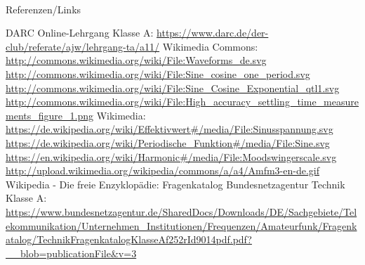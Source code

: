 \renewcommand{\refname}{Referenzen}

\hypertarget{refs}{}
\textcolor{white}{} \\ %
\Large Referenzen/Links
\footnotesize

\begin{thebibliography}{}
      DARC Online-Lehrgang Klasse A:
                    \url{https://www.darc.de/der-club/referate/ajw/lehrgang-ta/a11/}
        Wikimedia Commons: \\
                    \url{http://commons.wikimedia.org/wiki/File:Waveforms_de.svg}\\
                    \url{http://commons.wikimedia.org/wiki/File:Sine_cosine_one_period.svg}\\
                    \url{http://commons.wikimedia.org/wiki/File:Sine_Cosine_Exponential_qtl1.svg}\\
                    \url{http://commons.wikimedia.org/wiki/File:High_accuracy_settling_time_measurements_figure_1.png}
  	  Wikimedia:\\
  	  \url{https://de.wikipedia.org/wiki/Effektivwert#/media/File:Sinusspannung.svg}\\
  	  \url{https://de.wikipedia.org/wiki/Periodische_Funktion#/media/File:Sine.svg}\\
  	  \url{https://en.wikipedia.org/wiki/Harmonic#/media/File:Moodswingerscale.svg}\\
  	  \url{http://upload.wikimedia.org/wikipedia/commons/a/a4/Amfm3-en-de.gif}\\
  	    Wikipedia - Die freie Enzyklopädie:
  	   Fragenkatalog Bundesnetzagentur Technik Klasse A:\\
  	  \url{https://www.bundesnetzagentur.de/SharedDocs/Downloads/DE/Sachgebiete/Telekommunikation/Unternehmen_Institutionen/Frequenzen/Amateurfunk/Fragenkatalog/TechnikFragenkatalogKlasseAf252rId9014pdf.pdf?__blob=publicationFile&v=3}

\end{thebibliography} 


